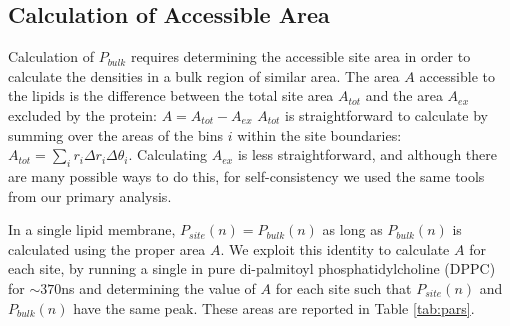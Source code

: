 \subsection{Calculation of Accessible Area}

Calculation of $P_{bulk}$ requires determining the accessible site area in order to calculate the densities in a bulk region of similar area. The area $A$ accessible to the lipids is the difference between the total site area $A_{tot}$ and the area $A_{ex}$ excluded by the protein: $A = A_{tot} - A_{ex}  $
$A_{tot}$ is straightforward to calculate by summing over the areas of the bins $i$ within the site boundaries: $A_{tot} = \sum_i r_i \Delta r_i  \Delta \theta_i$.  Calculating $A_{ex}$ is less straightforward, and although there are many possible ways to do this, for self-consistency we used the same tools from our primary analysis.  

In a single lipid membrane, $P_{site}(n)=P_{bulk}(n)$ as long as $P_{bulk}(n)$ is calculated using the proper area $A$.  We exploit this identity to calculate $A$ for each site, by running a single \nachr{} in pure di-palmitoyl phosphatidylcholine (DPPC) for $\sim 370$ns and determining the value of $A$ for each site such that $P_{site}(n)$ and $P_{bulk}(n)$ have the same peak.  These areas are reported in Table \ref{tab:pars}. 

    
